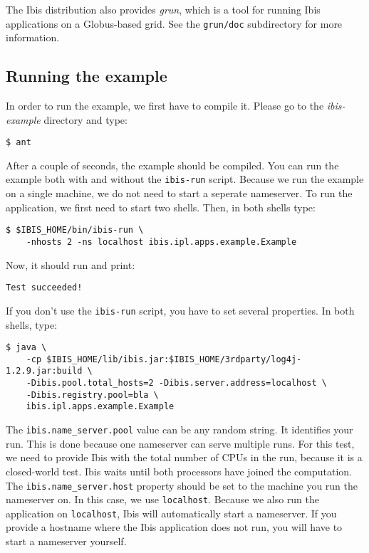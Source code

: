 \documentclass[10pt]{article}
\newcommand{\mysubsection}[1]{\subsection{#1}\label{#1}}
\begin{document}
The Ibis distribution also provides \emph{grun}, which is a tool for
running Ibis applications on a Globus-based grid. See the
\texttt{grun/doc} subdirectory for more information.

\mysubsection{Running the example}
In order to run the example, we first have to compile it.
Please go to the \emph{ibis-example} directory and type:

\noindent
{\small
\begin{verbatim}
$ ant
\end{verbatim}
}
\noindent
After a couple of seconds, the example should be compiled.
You can run the example both with and without the \texttt{ibis-run} script.
Because we run the example on a single machine, we do not need to start a seperate nameserver.
To run the application, we first need to start two shells.
Then, in both shells type:

\noindent
{\small
\begin{verbatim}
$ $IBIS_HOME/bin/ibis-run \
    -nhosts 2 -ns localhost ibis.ipl.apps.example.Example
\end{verbatim}
}
\noindent
Now, it should run and print:

\noindent
{\small
\begin{verbatim}
Test succeeded!
\end{verbatim}
}
\noindent
If you don't use the \texttt{ibis-run} script, you have to set several properties.
In both shells, type:

\noindent
{\small
\begin{verbatim}
$ java \
    -cp $IBIS_HOME/lib/ibis.jar:$IBIS_HOME/3rdparty/log4j-1.2.9.jar:build \
    -Dibis.pool.total_hosts=2 -Dibis.server.address=localhost \
    -Dibis.registry.pool=bla \
    ibis.ipl.apps.example.Example
\end{verbatim}
}
\noindent
The \texttt{ibis.name\_server.pool} value can be any random string.
It identifies your run.
This is done because one nameserver can serve multiple
runs. For this test, we need to provide Ibis with the total number of
CPUs in the run, because it is a closed-world test. Ibis waits until
both processors have joined the computation.
The \texttt{ibis.name\_server.host} property should
be set to the machine you run the nameserver on.  In this case, we use
\texttt{localhost}.
Because we also run the application on \texttt{localhost}, Ibis will
automatically start a nameserver. If you provide a hostname where the
Ibis application does not run, you will have to start a nameserver
yourself.
\end{document}
